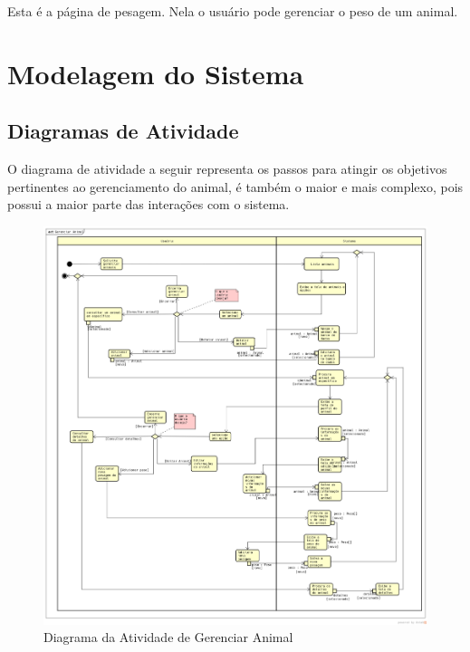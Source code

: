 \documentclass[12pt]{article}
\begin{document}
	Esta é a página de pesagem. Nela o usuário pode gerenciar o peso de um animal.

	\newpage
	\section{Modelagem do Sistema}

	\subsection{Diagramas de Atividade}

	O diagrama de atividade a seguir representa os passos para atingir os objetivos pertinentes ao gerenciamento do animal, é também o maior e mais complexo, pois possui a maior parte das interações com o sistema.

	\begin{figure}[!h]
		\begin{center}
			\caption{Diagrama da Atividade de Gerenciar Animal}
			\includegraphics[width=6in]{img/atividadeanimal.png}

		\end{center}
	\end{figure}

	\newpage
\end{document}
